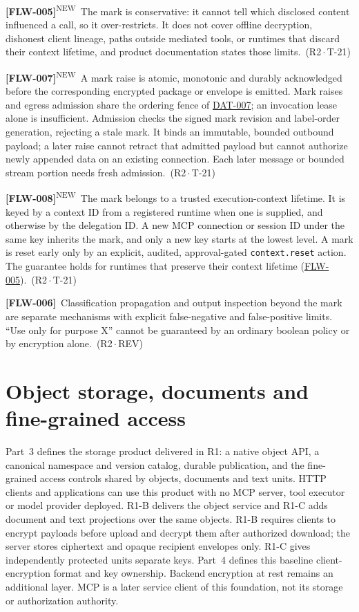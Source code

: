 \documentclass[11pt,a4paper]{article}
\newcommand{\code}[1]{{\small\nolinkurl{#1}}}
\newcommand{\rr}[1]{\hyperlink{req:#1}{#1}}
\newcommand{\reqtag}[2]{{\footnotesize\color{accent}(#1\,$\cdot$\,#2)}}
\newcommand{\req}[4]{\par\noindent\hypertarget{req:#1}{\textbf{[#1]}}\ #4\ \reqtag{#2}{#3}\par}
\newcommand{\reqn}[4]{\par\noindent\hypertarget{req:#1}{\textbf{[#1]}}\textsuperscript{\color{accent}\tiny NEW}\ #4\ \reqtag{#2}{#3}\par}
\begin{document}
\reqn{FLW-005}{R2}{T-21}{The mark is conservative: it cannot tell which disclosed content influenced a call, so it over-restricts. It does not cover offline decryption, dishonest client lineage, paths outside mediated tools, or runtimes that discard their context lifetime, and product documentation states those limits.}
\reqn{FLW-007}{R2}{T-21}{A mark raise is atomic, monotonic and durably acknowledged before the corresponding encrypted package or envelope is emitted. Mark raises and egress admission share the ordering fence of \rr{DAT-007}; an invocation lease alone is insufficient. Admission checks the signed mark revision and label-order generation, rejecting a stale mark. It binds an immutable, bounded outbound payload; a later raise cannot retract that admitted payload but cannot authorize newly appended data on an existing connection. Each later message or bounded stream portion needs fresh admission.}
\reqn{FLW-008}{R2}{T-21}{The mark belongs to a trusted execution-context lifetime. It is keyed by a context ID from a registered runtime when one is supplied, and otherwise by the delegation ID. A new MCP connection or session ID under the same key inherits the mark, and only a new key starts at the lowest level. A mark is reset early only by an explicit, audited, approval-gated \code{context.reset} action. The guarantee holds for runtimes that preserve their context lifetime (\rr{FLW-005}).}
\req{FLW-006}{R2}{REV}{Classification propagation and output inspection beyond the mark are separate mechanisms with explicit false-negative and false-positive limits. ``Use only for purpose X'' cannot be guaranteed by an ordinary boolean policy or by encryption alone.}



\section{Object storage, documents and fine-grained access}\label{sec:content}
Part~3 defines the storage product delivered in R1: a native object API, a canonical namespace and version catalog, durable publication, and the fine-grained access controls shared by objects, documents and text units. HTTP clients and applications can use this product with no MCP server, tool executor or model provider deployed. R1-B delivers the object service and R1-C adds document and text projections over the same objects. R1-B requires clients to encrypt payloads before upload and decrypt them after authorized download; the server stores ciphertext and opaque recipient envelopes only. R1-C gives independently protected units separate keys. Part~4 defines this baseline client-encryption format and key ownership. Backend encryption at rest remains an additional layer. MCP is a later service client of this foundation, not its storage or authorization authority.
\end{document}

